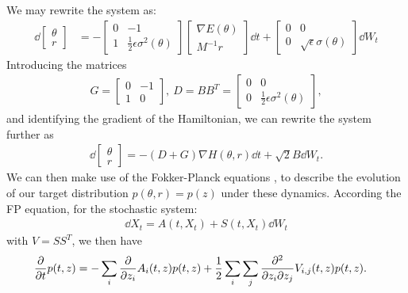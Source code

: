 We may rewrite the system  as:
\begin{align*}
    \dd{\begin{bmatrix}\theta \\ r \end{bmatrix}} &= 
    -\begin{bmatrix}
        0 & -1 \\ 
        1 & \frac{1}{2}\epsilon\sigma^2(\theta)
    \end{bmatrix} \begin{bmatrix}
        \nabla{E}(\theta)  \\ M^{-1}r
    \end{bmatrix}\dd{t} + \begin{bmatrix}
        0 & 0 \\ 
        0 & \sqrt{\epsilon}\sigma(\theta)
    \end{bmatrix} \dd{W_t} 
\end{align*}
Introducing the matrices
\begin{align} \label{eq:stoch-hmc-matrix-defs}
    G=\begin{bmatrix}0 & -1 \\ 1 & 0 \end{bmatrix}, ~D = BB^T= \begin{bmatrix}
        0 & 0 \\ 
        0 & \frac{1}{2}\epsilon\sigma^2(\theta)
    \end{bmatrix},
\end{align}
and identifying the gradient of the Hamiltonian, we can rewrite the system further as 
\begin{align}
    \dd{\begin{bmatrix}\theta \\ r\end{bmatrix}}= - (D+G) \nabla H(\theta, r)\dd{t} + \sqrt{2}B \dd{W_t}.
\end{align}
We can then make use of the Fokker-Planck equations \cite{ottinger_stochastic_1996}, to describe the evolution of our target distribution $p(\theta, r)=p(z)$ under these dynamics.
According the FP equation, for the stochastic system:
\begin{align}
    \dd{X_t} =A(t, X_t) + S(t, X_t)\dd{W_t}
\end{align}
with $V=SS^T$, we then have
\begin{align*}
    \pdv{t} p(t, z) &= - \sum_{i} \pdv{z_i} A_i(t, z) p(t, z) 
    + \frac{1}{2}\sum_{i}\sum_{j}\pdv{}{z_i}{z_j}V_{i,j}(t, z)p(t, z). 
\end{align*}

